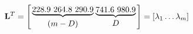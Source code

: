 \[ {\bf{L}}^T =\left[{ \underbrace{228.9~264.8~290.9}\atop (m-D)}{ \underbrace{741.6~980.9}\atop D}\right] =[\lambda_1\dots\lambda_m] \]